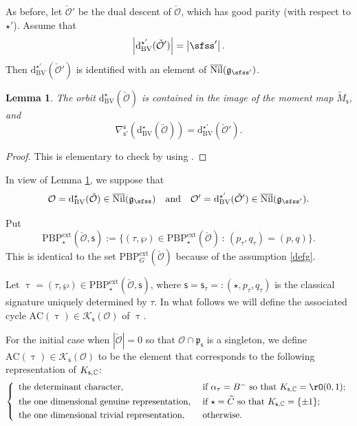 \documentclass[11pt,a4paper]{amsart}
\def\abs#1{\left|{#1}\right|}
\newcommand{\CK}{{\mathcal {K}}}
\newcommand{\CO}{{\mathcal {O}}}
\newcommand{\g}{\mathfrak g}
\newcommand{\p}{\mathfrak p}
\numberwithin{equation}{section}
\newtheorem{lem}[thm]{Lemma}
\theoremstyle{remark}
\def\Nil{\overline{\mathrm{Nil}}}
\def\PBPe{\mathrm{PBP}^{\mathrm{ext}}}
\begin{document}
As before, let $\check \CO'$ be the dual descent of $\check \CO$, which has good parity (with respect to $\star'$). Assume that
\[
  \abs{\mathrm d_{\mathrm{BV}}^{\star'}(\check \CO')}=\abs{\sfss'}.
\]
Then  $\mathrm d_{\mathrm{BV}}^{\star'}(\check \CO')$ is identified with an element of $\Nil(\g_{\sfss'})$.

\begin{lem}\label{dualdesc}
The orbit $\mathrm d_{\mathrm{BV}}^{\star}(\check \CO)$ is contained in the image of the moment map $\tilde M_{\mathsf s}$, and
\[
  \nabla_{\mathsf s'}^{\mathsf s}(\mathrm d_{\mathrm{BV}}^{\star}(\check \CO))=\mathrm d_{\mathrm{BV}}^{\star'}(\check \CO').
\]
\end{lem}
\begin{proof}
This is elementary to check by using .
\end{proof}

In view of Lemma \ref{dualdesc}, we suppose that
\[
\CO=\mathrm d_{\mathrm{BV}}^\star(\check \CO)\in \Nil(\g_\sfss)\quad \textrm{and}\quad \CO'=\mathrm d_{\mathrm{BV}}^{\star'}(\check \CO')\in \Nil(\g_{\sfss'}).
\]

Put
\begin{equation}\label{def:PBPs}
  \PBPe_\star(\check \CO,\mathsf s):=\{(\tau, \wp)\in  \PBPe_\star(\check \CO)\,:\, (p_\tau,q_\tau)=(p,q)\}.
\end{equation}
This is identical to the set $ \PBPe_G(\check \CO)$ because of the assumption \eqref{defg}. 

Let $\uptau=(\tau, \wp)\in \PBPe_\star(\check \CO,\mathsf s)$, where $\mathsf s=\mathsf s_{\tau}=:(\star, p_\tau, q_\tau)$ is the classical signature uniquely determined by $\tau$. In what follows we will define the associated cycle $\mathrm{AC}(\uptau)\in\CK_{\mathsf s}(\CO)$ of $\uptau$.

For the initial case when $|\check \CO|=0$
so that $\CO\cap \p_{\mathsf s}$ is a singleton, we define  $\mathrm{AC}(\uptau)\in\CK_{\mathsf s}(\CO)$ to be the element that corresponds to the following  representation of $K_{\mathsf s,\mathbb{C}}$:
 \[
\left\{
     \begin{array}{ll}
                    \textrm{the determinant character} , &\hbox{ if $\alpha_\tau=B^-$ so that $K_{\mathsf s,\C}=\rO(0,1)$;} \smallskip\\
                    \textrm{the one dimensional genuine representation} , &\hbox{ if $\star=\widetilde C$ so that $K_{\mathsf s,\C}=\{\pm 1\}$;} \smallskip\\
 \textrm{the one dimensional trivial representation} , &\hbox{ otherwise.}            \end{array}
   \right.
\]
\end{document}
